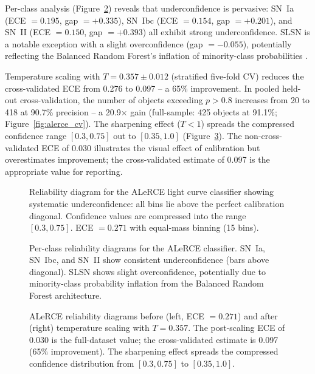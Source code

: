 \documentclass[twocolumn]{aastex631}
\begin{document}
Per-class analysis (Figure~\ref{fig:alerce_perclass}) reveals that underconfidence is pervasive: SN~Ia (ECE $= 0.195$, gap $= +0.335$), SN~Ibc (ECE $= 0.154$, gap $= +0.201$), and SN~II (ECE $= 0.150$, gap $= +0.393$) all exhibit strong underconfidence. SLSN is a notable exception with a slight overconfidence (gap $= -0.055$), potentially reflecting the Balanced Random Forest's inflation of minority-class probabilities \citep{vandengoorbergh2022}.

Temperature scaling with $T = 0.357 \pm 0.012$ (stratified five-fold CV) reduces the cross-validated ECE from 0.276 to 0.097 -- a 65\% improvement. In pooled held-out cross-validation, the number of objects exceeding $p > 0.8$ increases from 20 to 418 at 90.7\% precision -- a 20.9$\times$ gain (full-sample: 425 objects at 91.1\%; Figure~\ref{fig:alerce_cv}). The sharpening effect ($T < 1$) spreads the compressed confidence range $[0.3, 0.75]$ out to $[0.35, 1.0]$ (Figure~\ref{fig:alerce_tempscaling}). The non-cross-validated ECE of 0.030 illustrates the visual effect of calibration but overestimates improvement; the cross-validated estimate of 0.097 is the appropriate value for reporting.

\begin{figure}
\caption{Reliability diagram for the ALeRCE light curve classifier showing systematic underconfidence: all bins lie above the perfect calibration diagonal. Confidence values are compressed into the range $[0.3, 0.75]$. ECE $= 0.271$ with equal-mass binning (15 bins). \label{fig:alerce_reliability}}
\end{figure}

\begin{figure}
\caption{Per-class reliability diagrams for the ALeRCE classifier. SN~Ia, SN~Ibc, and SN~II show consistent underconfidence (bars above diagonal). SLSN shows slight overconfidence, potentially due to minority-class probability inflation from the Balanced Random Forest architecture. \label{fig:alerce_perclass}}
\end{figure}

\begin{figure}
\caption{ALeRCE reliability diagrams before (left, ECE $= 0.271$) and after (right) temperature scaling with $T = 0.357$. The post-scaling ECE of 0.030 is the full-dataset value; the cross-validated estimate is 0.097 (65\% improvement). The sharpening effect spreads the compressed confidence distribution from $[0.3, 0.75]$ to $[0.35, 1.0]$. \label{fig:alerce_tempscaling}}
\end{figure}
\end{document}
